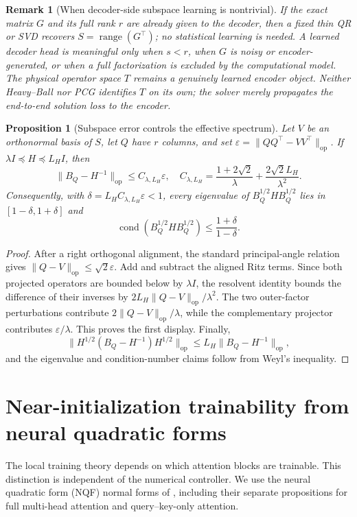 \documentclass[11pt]{article}
\newtheorem{proposition}{Proposition}
\newtheorem{remark}{Remark}
\newcommand{\op}{\mathrm{op}}
\newcommand{\range}{\operatorname{range}}
\newcommand{\cond}{\operatorname{cond}}
\begin{document}
\begin{remark}[When decoder-side subspace learning is nontrivial]
If the exact matrix $G$ and its full rank $r$ are already given to the decoder,
then a fixed thin QR or SVD recovers $S=\range(G^\top)$; no statistical learning
is needed.  A learned decoder head is meaningful only when $s<r$, when $G$ is
noisy or encoder-generated, or when a full factorization is excluded by the
computational model.  The physical operator space $T$ remains a genuinely
learned encoder object.  Neither Heavy--Ball nor PCG identifies $T$ on its own;
the solver merely propagates the end-to-end solution loss to the encoder.
\end{remark}

\begin{proposition}[Subspace error controls the effective spectrum]
Let $V$ be an orthonormal basis of $S$, let $Q$ have $r$ columns, and set
$\varepsilon=\|QQ^\top-VV^\top\|_{\op}$.  If
$\lambda I\preceq H\preceq L_HI$, then
\[
 \|B_Q-H^{-1}\|_{\op}
 \leq C_{\lambda,L_H}\varepsilon,
 \quad
 C_{\lambda,L_H}
 =\frac{1+2\sqrt2}{\lambda}
  +\frac{2\sqrt2L_H}{\lambda^2}.
\]
Consequently, with
$\delta=L_HC_{\lambda,L_H}\varepsilon<1$, every eigenvalue of
$B_Q^{1/2}HB_Q^{1/2}$ lies in $[1-\delta,1+\delta]$ and
\[
 \cond(B_Q^{1/2}HB_Q^{1/2})
 \leq\frac{1+\delta}{1-\delta}.
 \label{eq:kappa-transfer}
\]
\end{proposition}
\begin{proof}
After a right orthogonal alignment, the standard principal-angle relation
gives $\|Q-V\|_{\op}\leq\sqrt2\varepsilon$.  Add and subtract the aligned
Ritz terms.  Since both projected operators are bounded below by $\lambda I$,
the resolvent identity bounds the difference of their inverses by
$2L_H\|Q-V\|_{\op}/\lambda^2$.  The two outer-factor perturbations contribute
$2\|Q-V\|_{\op}/\lambda$, while the complementary projector contributes
$\varepsilon/\lambda$.  This proves the first display.  Finally,
\[
 \|H^{1/2}(B_Q-H^{-1})H^{1/2}\|_{\op}
 \leq L_H\|B_Q-H^{-1}\|_{\op},
\]
and the eigenvalue and condition-number claims follow from Weyl's inequality.
\end{proof}

\section{Near-initialization trainability from neural quadratic forms}

The local training theory depends on which attention blocks are trainable.
This distinction is independent of the numerical controller.  We use the
neural quadratic form (NQF) normal forms of
\cite{ziyin2026neuralquadraticforms}, including their separate propositions
for full multi-head attention and query--key-only attention.
\end{document}
